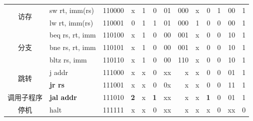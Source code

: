 \begin{table}
\begin{tabular}{|c|l|l|r|r|r|cc|r|r|r|r|r|r|}
    \hline
    \multirow{2}[4]{*}{访存} & sw rt, imm(rs) & 110000 & x     & 1     & 0     & \multicolumn{2}{c|}{01} & 000   & x     & 0     & 1     & 00    & 1 \bigstrut\\
\cline{2-14}          & lw rt, imm(rs) & 110001 & 0     & 1     & 1     & \multicolumn{2}{c|}{01} & 000   & 1     & 0     & 0     & 00    & 1 \bigstrut\\
    \hline
    \multirow{3}[6]{*}{分支} & beq rs, rt, imm & 110100 & x     & 1     & 0     & \multicolumn{2}{c|}{00} & 001   & x     & 0     & 0     & 10    & 1 \bigstrut\\
\cline{2-14}          & bne rs, rt, imm & 110101 & x     & 1     & 0     & \multicolumn{2}{c|}{00} & 001   & x     & 0     & 0     & 10    & 1 \bigstrut\\
\cline{2-14}          & bltz rs, imm & 110110 & x     & 1     & 0     & \multicolumn{2}{c|}{00} & 110   & x     & 0     & 0     & 10    & 1 \bigstrut\\
    \hline
    \multirow{2}[4]{*}{跳转} & j addr & 111000 & x     & x     & 0     & \multicolumn{2}{c|}{xx} & x     & x     & 0     & 0     & 01    & 1 \bigstrut\\
\cline{2-14}          & \textbf{jr rs} & 111001 & x     & x     & 0     & \multicolumn{2}{c|}{0x} & x     & x     & 0     & 0     & 11    & 1 \bigstrut\\
    \hline
    调用子程序 & \textbf{jal addr} & 111010 & \textbf{2} & x     & \textbf{1} & \multicolumn{2}{c|}{xx} & x     & x     & \textbf{1} & 0     & 01    & 1 \bigstrut\\
    \hline
    停机    & halt  & 111111 & x     & x     & 0     & \multicolumn{2}{c|}{xx} & x     & x     & x     & 0     & xx    & 0 \bigstrut\\
    \hline
    \end{tabular}%
  \label{tab:control_codes}%
\end{table}%
